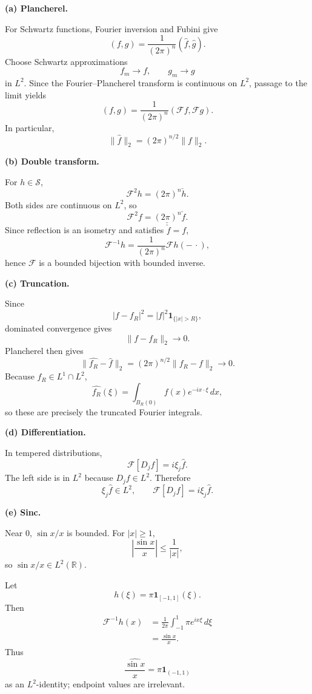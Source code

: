 \begin{solution}
\par\smallskip\noindent\textbf{(a) Plancherel.}

For Schwartz functions, Fourier inversion and Fubini give
\[
(f,g)
=
\frac1{(2\pi)^n}
(\widehat f,\widehat g).
\]
Choose Schwartz approximations
\[
f_m\to f,\qquad g_m\to g
\]
in \(L^2\). Since the Fourier--Plancherel transform is continuous on
\(L^2\), passage to the limit yields
\[
\boxed{
(f,g)
=
\frac1{(2\pi)^n}
(\mathcal Ff,\mathcal Fg).}
\]
In particular,
\[
\|\widehat f\|_2
=
(2\pi)^{n/2}\|f\|_2.
\]

\par\smallskip\noindent\textbf{(b) Double transform.}

For \(h\in\mathcal S\),
\[
\mathcal F^2h
=
(2\pi)^n\check h.
\]
Both sides are continuous on \(L^2\), so
\[
\boxed{
\mathcal F^2f
=
(2\pi)^n\check f.}
\]
Since reflection is an isometry and satisfies \(\check{\check f}=f\),
\[
\mathcal F^{-1}h
=
\frac1{(2\pi)^n}
\mathcal Fh(-\,\cdot),
\]
hence \(\mathcal F\) is a bounded bijection with bounded inverse.

\par\smallskip\noindent\textbf{(c) Truncation.}

Since
\[
|f-f_R|^2
=
|f|^2\mathbf1_{\{|x|>R\}},
\]
dominated convergence gives
\[
\|f-f_R\|_2\to0.
\]
Plancherel then gives
\[
\boxed{
\|\widehat{f_R}-\widehat f\|_2
=
(2\pi)^{n/2}\|f_R-f\|_2
\to0.}
\]
Because \(f_R\in L^1\cap L^2\),
\[
\widehat{f_R}(\xi)
=
\int_{B_R(0)}
f(x)e^{-ix\cdot\xi}\,dx,
\]
so these are precisely the truncated Fourier integrals.

\par\smallskip\noindent\textbf{(d) Differentiation.}

In tempered distributions,
\[
\mathcal F[D_jf]
=
i\xi_j\widehat f.
\]
The left side is in \(L^2\) because \(D_jf\in L^2\). Therefore
\[
\boxed{
\xi_j\widehat f\in L^2,
\qquad
\mathcal F[D_jf]=i\xi_j\widehat f.}
\]

\par\smallskip\noindent\textbf{(e) Sinc.}

Near \(0\), \(\sin x/x\) is bounded. For \(|x|\ge1\),
\[
\left|\frac{\sin x}{x}\right|
\le\frac1{|x|},
\]
so \(\sin x/x\in L^2(\mathbb R)\).

Let
\[
h(\xi)=\pi\mathbf1_{[-1,1]}(\xi).
\]
Then
\[
\begin{aligned}
\mathcal F^{-1}h(x)
&=
\frac1{2\pi}
\int_{-1}^1
\pi e^{ix\xi}\,d\xi\\
&=
\frac{\sin x}{x}.
\end{aligned}
\]
Thus
\[
\boxed{
\widehat{\frac{\sin x}{x}}
=
\pi\mathbf1_{(-1,1)}
}
\]
as an \(L^2\)-identity; endpoint values are irrelevant.


\end{solution}
